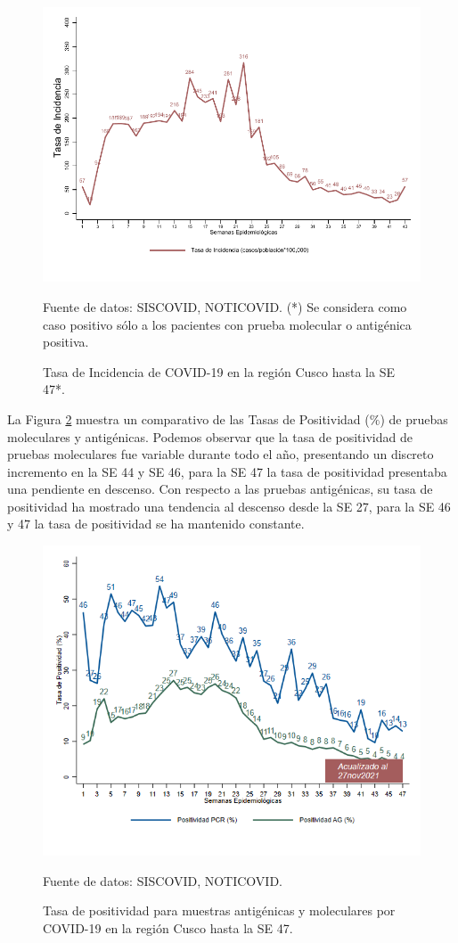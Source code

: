 \documentclass[12pt,a4paper,openany]{book}
\begin{document}
   \begin{figure}[h]
   	\caption{Tasa de Incidencia de COVID-19 en la región Cusco hasta la SE 47*. }\label{fig:incidencia}
   	\begin{center}
   		\includegraphics[width=0.65\linewidth]{../figuras/tasa_incidencia}
   	\end{center}
   	{\footnotesize {Fuente de datos: SISCOVID, NOTICOVID. (*) Se considera como caso positivo sólo a los pacientes con prueba molecular o antigénica positiva.}}
   \end{figure}
   
   La Figura \ref{fig:total_muestras_procesada} muestra un comparativo de las Tasas de Positividad ($\%$) de pruebas moleculares y antigénicas. Podemos observar que la tasa de positividad de pruebas moleculares fue variable durante todo el año, presentando un discreto incremento en la SE 44 y SE 46, para la SE 47 la tasa de positividad presentaba una pendiente en descenso. Con respecto a las pruebas antigénicas, su tasa de positividad ha mostrado una tendencia al descenso desde la SE 27, para la SE 46 y 47 la tasa de positividad se ha mantenido constante.
   
  
   
   \begin{figure}[h]
   	\caption{Tasa de positividad para muestras antigénicas y moleculares por COVID-19 en la región Cusco hasta la SE 47. }\label{fig:total_muestras_procesada}
   	\begin{center}
   		\includegraphics[width=0.75\linewidth]{../figuras/positividad_diaria}
   	\end{center}
   	{\footnotesize {Fuente de datos: SISCOVID, NOTICOVID.}}
   \end{figure}
\end{document}
